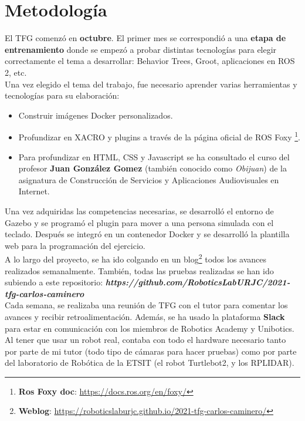 \section{Metodología}
\label{sec:metodologia}
El TFG comenzó en \textbf{octubre}. El primer mes se correspondió a una \textbf{etapa de entrenamiento} donde se empezó a probar distintas tecnologías para elegir correctamente el tema a desarrollar: Behavior Trees, Groot, aplicaciones en ROS 2, etc.\\

Una vez elegido el tema del trabajo, fue necesario aprender varias herramientas y tecnologías para su elaboración:
\begin{itemize}
	\item Construir imágenes Docker personalizados.
	\item Profundizar en XACRO y plugins a través de la página oficial de ROS Foxy \footnote{\textbf{Ros Foxy doc}: \url{https://docs.ros.org/en/foxy/}}.
	\item Para profundizar en HTML, CSS y Javascript se ha consultado el curso del profesor \textbf{Juan González Gomez} (también conocido como \textit{Obijuan}) de la asignatura de Construcción de Servicios y Aplicaciones Audiovisuales en Internet.
\end{itemize}

Una vez adquiridas las competencias necesarias, se desarrolló el entorno de Gazebo y se programó el plugin para mover a una persona simulada con el teclado. Después se integró en un contenedor Docker y se desarrolló la plantilla web para la programación del ejercicio.\\

A lo largo del proyecto, se ha ido colgando en un blog\footnote{\textbf{Weblog}: \url{https://roboticslaburjc.github.io/2021-tfg-carlos-caminero/}} todos los avances realizados semanalmente. También, todas las pruebas realizadas se han ido subiendo a este repositorio: \textbf{\textit{https://github.com/RoboticsLabURJC/2021-tfg-carlos-caminero}}\\

Cada semana, se realizaba una reunión de TFG con el tutor para comentar los avances y recibir retroalimentación. Además, se ha usado la plataforma \textbf{Slack} para estar en comunicación con los miembros de Robotics Academy y Unibotics.\\

Al tener que usar un robot real, contaba con todo el hardware necesario tanto por parte de mi tutor (todo tipo de cámaras para hacer pruebas) como por parte del laboratorio de Robótica de la ETSIT (el robot Turtlebot2, y los RPLIDAR).



